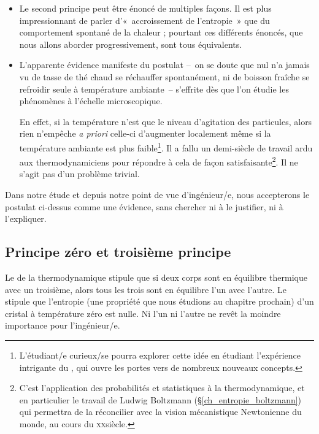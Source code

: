		\begin{itemize}
			\item Le second principe peut être énoncé de multiples façons. Il est plus impressionnant de parler d’«~accroissement de l’entropie~» que du comportement spontané de la chaleur ; pourtant ces différents énoncés, que nous allons aborder progressivement, sont tous équivalents.
			\item L’apparente évidence manifeste du postulat --\ on se doute que nul n’a jamais vu de tasse de thé chaud se réchauffer spontanément, ni de boisson fraîche se refroidir seule à température ambiante\ -- s’effrite dès que l’on étudie les phénomènes à l’échelle microscopique. 

		En effet, si la température n’est que le niveau d’agitation des particules, alors rien n’empêche \textit{a priori} celle-ci d’augmenter localement même si la température ambiante est plus faible\footnote{L’étudiant/e curieux/se pourra explorer cette idée en étudiant l’expérience intrigante du \textit{}, qui ouvre les portes vers de nombreux nouveaux concepts.}. Il a fallu un demi-siècle de travail ardu aux thermodynamiciens pour répondre à cela de façon satisfaisante\footnote{C’est l’application des probabilités et statistiques à la thermodynamique, et en particulier le travail de Ludwig Boltzmann (\S\ref{ch_entropie_boltzmann}) qui permettra de la réconcilier avec la vision mécanistique Newtonienne du monde, au cours du \textsc{xx}\ieme siècle.}. Il ne s’agit pas d’un problème trivial.
		\end{itemize}

		Dans notre étude et depuis notre point de vue d’ingénieur/e, nous accepterons le postulat ci-dessus comme une évidence, sans chercher ni à le justifier, ni à l’expliquer.
		
		
	\subsection{Principe zéro et troisième principe}
	
		Le  de la thermodynamique stipule que si deux corps sont en équilibre thermique avec un troisième, alors tous les trois sont en équilibre l’un avec l’autre. Le  stipule que l’entropie (une propriété que nous étudions au chapitre prochain) d’un cristal à température zéro est nulle. Ni l’un ni l’autre ne revêt la moindre importance pour l’ingénieur/e.



